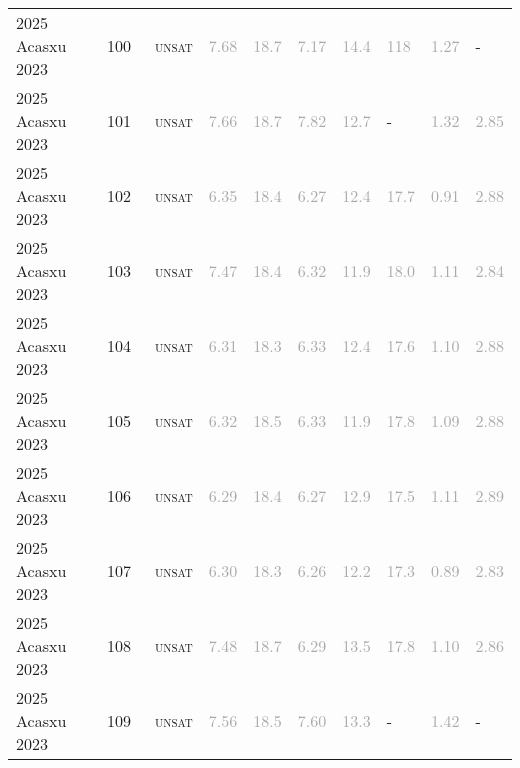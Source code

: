 \begin{center}
{\begin{longtable}{@{}llllllllll@{}}
2025 Acasxu 2023 & 100 & ~\textsc{unsat} & \textcolor{darkgray}{7.68} & \textcolor{darkgray}{18.7} & \textcolor{darkgray}{7.17} & \textcolor{darkgray}{14.4} & \textcolor{darkgray}{118} & \textcolor{darkgray}{1.27} & - \\
2025 Acasxu 2023 & 101 & ~\textsc{unsat} & \textcolor{darkgray}{7.66} & \textcolor{darkgray}{18.7} & \textcolor{darkgray}{7.82} & \textcolor{darkgray}{12.7} & - & \textcolor{darkgray}{1.32} & \textcolor{darkgray}{2.85} \\
2025 Acasxu 2023 & 102 & ~\textsc{unsat} & \textcolor{darkgray}{6.35} & \textcolor{darkgray}{18.4} & \textcolor{darkgray}{6.27} & \textcolor{darkgray}{12.4} & \textcolor{darkgray}{17.7} & \textcolor{darkgray}{0.91} & \textcolor{darkgray}{2.88} \\
2025 Acasxu 2023 & 103 & ~\textsc{unsat} & \textcolor{darkgray}{7.47} & \textcolor{darkgray}{18.4} & \textcolor{darkgray}{6.32} & \textcolor{darkgray}{11.9} & \textcolor{darkgray}{18.0} & \textcolor{darkgray}{1.11} & \textcolor{darkgray}{2.84} \\
2025 Acasxu 2023 & 104 & ~\textsc{unsat} & \textcolor{darkgray}{6.31} & \textcolor{darkgray}{18.3} & \textcolor{darkgray}{6.33} & \textcolor{darkgray}{12.4} & \textcolor{darkgray}{17.6} & \textcolor{darkgray}{1.10} & \textcolor{darkgray}{2.88} \\
2025 Acasxu 2023 & 105 & ~\textsc{unsat} & \textcolor{darkgray}{6.32} & \textcolor{darkgray}{18.5} & \textcolor{darkgray}{6.33} & \textcolor{darkgray}{11.9} & \textcolor{darkgray}{17.8} & \textcolor{darkgray}{1.09} & \textcolor{darkgray}{2.88} \\
2025 Acasxu 2023 & 106 & ~\textsc{unsat} & \textcolor{darkgray}{6.29} & \textcolor{darkgray}{18.4} & \textcolor{darkgray}{6.27} & \textcolor{darkgray}{12.9} & \textcolor{darkgray}{17.5} & \textcolor{darkgray}{1.11} & \textcolor{darkgray}{2.89} \\
2025 Acasxu 2023 & 107 & ~\textsc{unsat} & \textcolor{darkgray}{6.30} & \textcolor{darkgray}{18.3} & \textcolor{darkgray}{6.26} & \textcolor{darkgray}{12.2} & \textcolor{darkgray}{17.3} & \textcolor{darkgray}{0.89} & \textcolor{darkgray}{2.83} \\
2025 Acasxu 2023 & 108 & ~\textsc{unsat} & \textcolor{darkgray}{7.48} & \textcolor{darkgray}{18.7} & \textcolor{darkgray}{6.29} & \textcolor{darkgray}{13.5} & \textcolor{darkgray}{17.8} & \textcolor{darkgray}{1.10} & \textcolor{darkgray}{2.86} \\
2025 Acasxu 2023 & 109 & ~\textsc{unsat} & \textcolor{darkgray}{7.56} & \textcolor{darkgray}{18.5} & \textcolor{darkgray}{7.60} & \textcolor{darkgray}{13.3} & - & \textcolor{darkgray}{1.42} & - \\

\end{longtable}}
\end{center}

